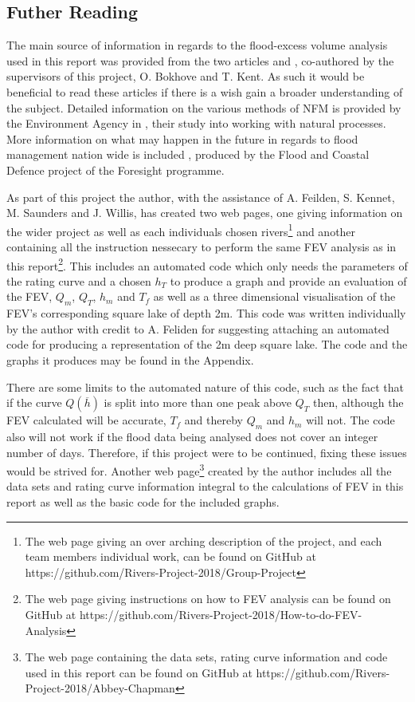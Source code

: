 \documentclass[11pt,a4paper]{article}
\begin{document}
\subsection{Futher Reading}
The main source of information in regards to the flood-excess volume analysis used in this report was provided from the two articles \cite{Aire} and \cite{Calder-Don}, co-authored by the supervisors of this project, O. Bokhove and T. Kent. As such it would be beneficial to read these articles if there is a wish gain a broader understanding of the subject. Detailed information on the various methods of NFM is provided by the Environment Agency in \cite{nfm}, their study into working with natural processes. More information on what may happen in the future in regards to flood management nation wide is included \cite{foresight}, produced by the Flood and Coastal Defence project of the Foresight programme.

As part of this project the author, with the assistance of A. Feilden, S. Kennet, M. Saunders and J. Willis, has created two web pages, one giving information on the wider project as well as each individuals chosen rivers\footnote{The web page giving an over arching description of the project, and each team members individual work, can be found on GitHub at https://github.com/Rivers-Project-2018/Group-Project} and another  containing all the instruction nessecary to perform the same FEV analysis as in this report\footnote{The web page giving instructions on how to FEV analysis can be found on GitHub at https://github.com/Rivers-Project-2018/How-to-do-FEV-Analysis}. This includes an automated code which only needs the parameters of the rating curve and a chosen $h_T$ to produce a graph and provide an evaluation of the FEV, $Q_m$, $Q_T$, $h_m$ and $T_f$ as well as a three dimensional visualisation of the FEV's corresponding square lake of depth 2m. This code was written individually by the author with credit to A. Feliden for suggesting attaching an automated code for producing a representation of the 2m deep square lake. The code and the graphs it produces may be found in the Appendix. 

There are some limits to the automated nature of this code, such as the fact that if the curve $Q(\overline{h})$ is split into more than one peak above $Q_T$ then, although the FEV calculated will be accurate, $T_f$ and thereby $Q_m$ and $h_m$ will not. The code also will not work if the flood data being analysed does not cover an integer number of days. Therefore, if this project were to be continued, fixing these issues would be strived for. Another web page\footnote{The web page containing the data sets, rating curve information and code used in this report can be found on GitHub at https://github.com/Rivers-Project-2018/Abbey-Chapman} created by the author includes all the data sets and rating curve information integral to the calculations of FEV in this report as well as the basic code for the included graphs.
\end{document}
